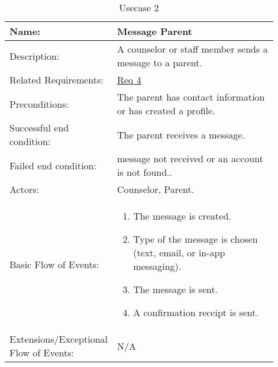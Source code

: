 \documentclass[11pt]{article}
\begin{document}
\begin{table}[!htb]
\caption{Usecase 2}
\label{des:message parent}
\begin{center}
\begin{tabular}{p{0.30\linewidth}p{0.60\linewidth}}
	Name: & Message Parent\\\hline
	Description: & A counselor or staff member sends a message to a parent.\\\hline
	Related Requirements:& \hyperlink{Req4}{Req 4}\\\hline
	Preconditions:& The parent has contact information or has created a profile.\\\hline
	Successful end condition:& The parent receives a message.\\\hline
	Failed end condition:& message not received or an account is not found.. \\\hline
	Actors:& Counselor, Parent.\\\hline
	Basic Flow of Events: & \begin{enumerate}[topsep=0pt]
		\item The message is created.
		\item Type of the message is chosen (text, email, or in-app messaging).
		\item The message is sent.
		\item A confirmation receipt is sent.
	\end{enumerate}\\\hline
	Extensions/Exceptional Flow of Events: & \vspace*{.25em}  N/A
\end{tabular}
\end{center}
\end{table}

\end{document}
